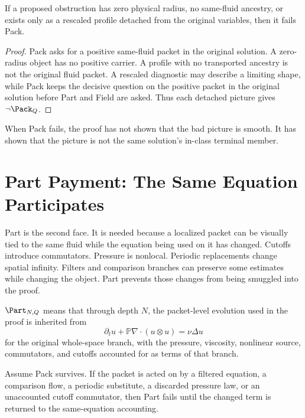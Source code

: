 \begin{lemma}
If a proposed obstruction has zero physical radius, no same-fluid ancestry, or exists only as a rescaled profile detached from the original variables, then it fails Pack.
\end{lemma}

\begin{proof}
Pack asks for a positive same-fluid packet in the original solution.
A zero-radius object has no positive carrier.
A profile with no transported ancestry is not the original fluid packet.
A rescaled diagnostic may describe a limiting shape, while Pack keeps the decisive question on the positive packet in the original solution before Part and Field are asked.
Thus each detached picture gives \(\neg\Pack_Q\).
\end{proof}

\begin{corollary}
When Pack fails, the proof has not shown that the bad picture is smooth.
It has shown that the picture is not the same solution's in-class terminal member.
\end{corollary}

\section{Part Payment: The Same Equation Participates}

Part is the second face.
It is needed because a localized packet can be visually tied to the same fluid while the equation being used on it has changed.
Cutoffs introduce commutators.
Pressure is nonlocal.
Periodic replacements change spatial infinity.
Filters and comparison branches can preserve some estimates while changing the object.
Part prevents those changes from being smuggled into the proof.

\begin{definition}
\(\Part_{N,Q}\) means that through depth \(N\), the packet-level evolution used in the proof is inherited from
\[
  \partial_t u+\mathbb P\nabla\cdot(u\otimes u)=\nu\Delta u
\]
for the original whole-space branch, with the pressure, viscosity, nonlinear source, commutators, and cutoffs accounted for as terms of that branch.
\end{definition}

\begin{lemma}
Assume Pack survives.
If the packet is acted on by a filtered equation, a comparison flow, a periodic substitute, a discarded pressure law, or an unaccounted cutoff commutator, then Part fails until the changed term is returned to the same-equation accounting.
\end{lemma}


